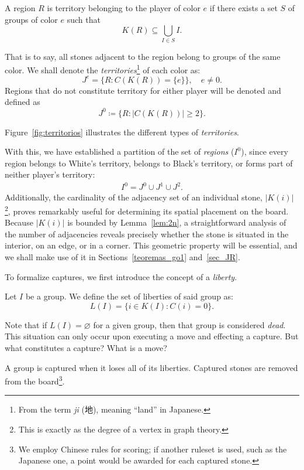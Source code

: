 \begin{definition}[Territory]
	A region \(R\) is territory belonging to the player of color \(e\) if there exists a set \(S\) of groups of color \(e\) such that
	$$ K(R) \subseteq \bigcup_{I\in S} I. $$
\end{definition}

That is to say, all stones adjacent to the region belong to groups of the same color. We shall denote the \textit{territories}\footnote{From the term \textit{ji} (地), meaning ``land'' in Japanese.} of each color as:
$$J^{e} = \{R : C(K(R)) = \{e\}\}, \quad e \neq 0.$$
Regions that do not constitute territory for either player will be denoted and defined as
$$J^{0}\coloneqq \{R : |C(K(R))| \geq 2\}.$$

Figure~\ref{fig:territorios} illustrates the different types of \textit{territories}.


With this, we have established a partition of the set of \textit{regions} ($I^{0}$), since every region belongs to White's territory, belongs to Black's territory, or forms part of neither player's territory:
\begin{align*}
	I^{0} = J^{0} \cup J^{1} \cup J^{2}.
\end{align*}
\label{posicion_espacial}
Additionally, the cardinality of the adjacency set of an individual stone, $|K(i)|$\footnote{This is exactly as the degree of a vertex in graph theory.}, proves remarkably useful for determining its spatial placement on the board. Because $|K(i)|$ is bounded by Lemma~\ref{lem:2n}, a straightforward analysis of the number of adjacencies reveals precisely whether the stone is situated in the interior, on an edge, or in a corner. This geometric property will be essential, and we shall make use of it in Sections~\ref{teoremas_go1} and~\ref{sec_JR}.

To formalize captures, we first introduce the concept of a \textit{liberty}.

\begin{definition}
	Let \(I\) be a group. We define the set of liberties of said group as:
	$$L(I) = \{i \in K(I) : C(i) = 0\}.$$
	\end{definition}

Note that if $L(I) = \varnothing$ for a given group, then that group is considered \textit{dead}. This situation can only occur upon executing a move and effecting a capture. But what constitutes a capture? What is a move?

A group is captured when it loses all of its liberties. Captured stones are removed from the board\footnote{We employ Chinese rules for scoring; if another ruleset is used, such as the Japanese one, a point would be awarded for each captured stone.}.

